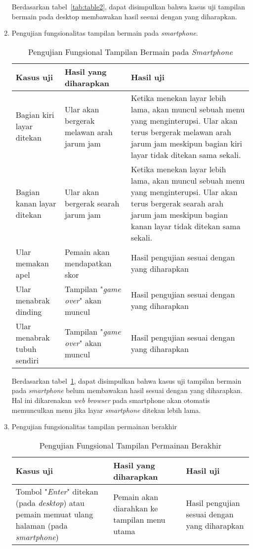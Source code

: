 \begin{enumerate}
	Berdasarkan tabel~\ref{tab:table2}, dapat disimpulkan bahwa kasus uji tampilan bermain pada desktop membawakan hasil sesuai dengan yang diharapkan. 
	
	\item Pengujian fungsionalitas tampilan bermain pada \textit{smartphone}.
	
	\begin{table}[H]
		\caption{Pengujian Fungsional Tampilan Bermain pada \textit{Smartphone}} \label{tab:table3}
		\begin{tabular}{| m{4cm} | m{6cm}  | m{4cm} |}
			\hline
			Kasus uji & Hasil yang diharapkan & Hasil uji \\ \hline
			Bagian kiri layar ditekan & Ular akan bergerak melawan arah jarum jam & Ketika menekan layar lebih lama, akan muncul sebuah menu yang menginterupsi. Ular akan terus bergerak melawan arah jarum jam meskipun bagian kiri layar tidak ditekan sama sekali.\\ \hline
			Bagian kanan layar ditekan & Ular akan bergerak searah jarum jam & Ketika menekan layar lebih lama, akan muncul sebuah menu yang menginterupsi. Ular akan terus bergerak searah arah jarum jam meskipun bagian kanan layar tidak ditekan sama sekali.\\ \hline
			Ular memakan apel & Pemain akan mendapatkan skor & Hasil pengujian sesuai dengan yang diharapkan\\ \hline
			Ular menabrak dinding & Tampilan "\textit{game over}" akan muncul & Hasil pengujian sesuai dengan yang diharapkan\\ \hline
			Ular menabrak tubuh sendiri & Tampilan "\textit{game over}" akan muncul & Hasil pengujian sesuai dengan yang diharapkan\\ \hline 
		\end{tabular}
	\end{table}
	
	Berdasarkan tabel~\ref{tab:table3}, dapat disimpulkan bahwa kasus uji tampilan bermain pada \textit{smartphone} belum membawakan hasil sesuai dengan yang diharapkan. Hal ini dikarenakan \textit{web browser} pada  smartphone akan otomatis memunculkan menu jika layar \textit{smartphone} ditekan lebih lama.
	
	\item Pengujian fungsionalitas tampilan permainan berakhir
	
	\begin{table}[H]
		\caption{Pengujian Fungsional Tampilan Permainan Berakhir} \label{tab:table4}
		\begin{tabular}{| m{4cm} | m{6cm}  | m{4cm} |}
			\hline
			Kasus uji & Hasil yang diharapkan & Hasil uji \\ \hline
			Tombol "\textit{Enter}" ditekan (pada \textit{desktop}) atau pemain memuat ulang halaman (pada \textit{smartphone})& Pemain akan diarahkan ke tampilan menu utama & Hasil pengujian sesuai dengan yang diharapkan\\ \hline
		\end{tabular}
	\end{table}
	

\end{enumerate}
